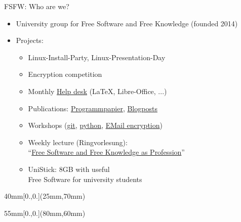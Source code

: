 \documentclass[t]{beamer}
\begin{document}

\begin{frame}[label=ct1]{\color{fg}FSFW: Who are we?}

  \begin{itemize}
  \item University group for Free Software and Free Knowledge {\footnotesize (founded 2014)}
  \item Projects:
  \begin{itemize}
   \item Linux-Install-Party, Linux-Presentation-Day
   \item Encryption competition
   \item Monthly \href{https://fsfw-dresden.de/sprechstunde}{Help desk} (\LaTeX, Libre-Office, ...)
   \item Publications: \href{https://fsfw-dresden.de/programm}{Programmpapier}, \href{https://fsfw-dresden.de/blog}{Blogposts}
   \item Workshops (\href{https://fsfw-dresden.de/git-ws}{git}, \href{https://fsfw-dresden.de/python-workshop}{python},
   \href{https://fsfw-dresden.de/gpg}{EMail encryption})
   \item Weekly lecture (Ringvorlesung): \\
   "`\href{https://fsfw-dresden.de/ringvorlesung}{Free Software and Free Knowledge as Profession}"'
   \smallskip
   \item UniStick: 8GB with useful\\
   Free Software for university students
  \end{itemize}
  \end{itemize}


\begin{textblock*}{40mm}[0.,0.](25mm,70mm)
\end{textblock*}

\begin{textblock*}{55mm}[0.,0.](80mm,60mm)
\end{textblock*}

\end{frame}
\end{document}
